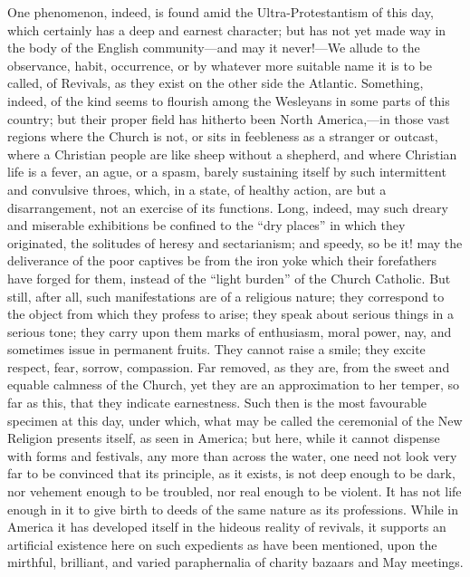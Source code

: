 One
phenomenon, indeed, is found amid the Ultra-Protestantism of this day,
which certainly has a deep and earnest character; but has not yet made
way in the body of the English community—and may it never!—We allude
to the observance, habit, occurrence, or by whatever more suitable name
it is to be called, of Revivals, as they exist on the other side the
Atlantic. Something, indeed, of the kind seems to flourish among the
Wesleyans in some parts of this country; but their proper field has
hitherto been North America,—in those vast regions where the Church is
not, or sits in feebleness as a stranger or outcast, where a Christian
people are like sheep without a shepherd, and where Christian life is a
fever, an ague, or a spasm, barely sustaining itself by such
intermittent and convulsive throes, which, in a state, of
healthy action, are but a disarrangement, not an exercise of its
functions. Long, indeed, may such dreary and miserable exhibitions be
confined to the ``dry places'' in which they originated, the solitudes
of heresy and sectarianism; and speedy, so be it! may the deliverance of
the poor captives be from the iron yoke which their forefathers have
forged for them, instead of the ``light burden'' of the Church
Catholic. But still, after all, such manifestations are of a religious
nature; they correspond to the object from which they profess to arise;
they speak about serious things in a serious tone; they carry upon them
marks of enthusiasm, moral power, nay, and sometimes issue in permanent
fruits. They cannot raise a smile; they excite respect, fear, sorrow,
compassion. Far removed, as they are, from the sweet and equable
calmness of the Church, yet they are an approximation to her temper, so
far as this, that they indicate earnestness. Such then is the most
favourable specimen at this day, under which, what may be called the
ceremonial of the New Religion presents itself, as seen in America; but
here, while it cannot dispense with forms and festivals, any more than
across the water, one need not look very far to be convinced that its
principle, as it exists, is not deep enough to be dark, nor vehement
enough to be troubled, nor real enough to be violent. It has not life
enough in it to give birth to deeds of the same nature as its
professions. While in America it has developed itself in the hideous
reality of revivals, it supports an artificial existence here on such
expedients as have been mentioned, upon the mirthful, brilliant, and
varied paraphernalia of charity bazaars and May meetings.

